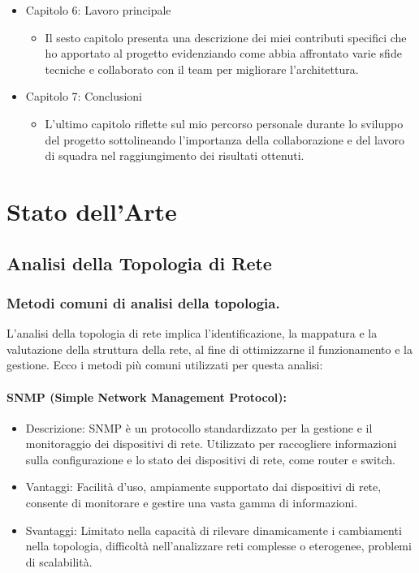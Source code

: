 \documentclass[target=bach,aauheader=,style=]{thud}
\begin{document}
\begin{itemize}
  \item Capitolo 6: Lavoro principale 
    \begin{itemize}
      \item[] Il sesto capitolo presenta una descrizione dei miei contributi specifici che ho apportato al progetto evidenziando come abbia affrontato varie sfide tecniche e collaborato con il team per migliorare l'architettura.
    \end{itemize}

  \item Capitolo 7: Conclusioni
    \begin{itemize}
      \item[] L'ultimo capitolo riflette sul mio percorso personale durante lo sviluppo del progetto sottolineando l'importanza della collaborazione e del lavoro di squadra nel raggiungimento dei risultati ottenuti. 
    \end{itemize}

\end{itemize}


\chapter{Stato dell'Arte}
\label{art}
\section{Analisi della Topologia di Rete}
\subsection{Metodi comuni di analisi della topologia.}
L'analisi della topologia di rete implica l'identificazione, la mappatura e la valutazione della struttura della rete, al fine di ottimizzarne il funzionamento e la gestione. Ecco i metodi più comuni utilizzati per questa analisi:
\subsubsection{SNMP (Simple Network Management Protocol):}
    \begin{itemize}
      \item Descrizione: SNMP è un protocollo standardizzato per la gestione e il monitoraggio dei dispositivi di rete. Utilizzato per raccogliere informazioni sulla configurazione e lo stato dei dispositivi di rete, come router e switch.
      \item Vantaggi: Facilità d'uso, ampiamente supportato dai dispositivi di rete, consente di monitorare e gestire una vasta gamma di informazioni.
      \item Svantaggi: Limitato nella capacità di rilevare dinamicamente i cambiamenti nella topologia, difficoltà nell'analizzare reti complesse o eterogenee, problemi di scalabilità.
    \end{itemize}
\end{document}
